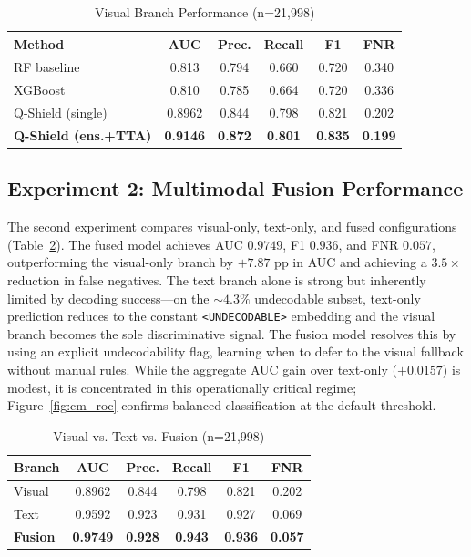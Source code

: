 \documentclass[conference]{IEEEtran}
\begin{document}
\begin{table}[!t]
\caption{Visual Branch Performance (n=21{,}998)}
\label{tab:visual}
\centering
\scriptsize
\begin{tabular}{lccccc}
\toprule
\textbf{Method} & \textbf{AUC} & \textbf{Prec.} & \textbf{Recall} & \textbf{F1} & \textbf{FNR} \\
\midrule
RF baseline & 0.813 & 0.794 & 0.660 & 0.720 & 0.340 \\
XGBoost & 0.810 & 0.785 & 0.664 & 0.720 & 0.336 \\
Q-Shield (single) & 0.8962 & 0.844 & 0.798 & 0.821 & 0.202 \\
\textbf{Q-Shield (ens.+TTA)} & \textbf{0.9146} & \textbf{0.872} & \textbf{0.801} & \textbf{0.835} & \textbf{0.199} \\
\bottomrule
\end{tabular}
\end{table}

\subsection{Experiment 2: Multimodal Fusion Performance}

The second experiment compares visual-only, text-only, and fused configurations (Table~\ref{tab:multimodal}). The fused model achieves AUC $0.9749$, F1 $0.936$, and FNR $0.057$, outperforming the visual-only branch by $+7.87$ pp in AUC and achieving a $3.5\times$ reduction in false negatives. The text branch alone is strong but inherently limited by decoding success---on the $\sim$$4.3\%$ undecodable subset, text-only prediction reduces to the constant \texttt{<UNDECODABLE>} embedding and the visual branch becomes the sole discriminative signal. The fusion model resolves this by using an explicit undecodability flag, learning when to defer to the visual fallback without manual rules. While the aggregate AUC gain over text-only ($+0.0157$) is modest, it is concentrated in this operationally critical regime; Figure~\ref{fig:cm_roc} confirms balanced classification at the default threshold.

\begin{table}[!t]
\caption{Visual vs. Text vs. Fusion (n=21{,}998)}
\label{tab:multimodal}
\centering
\scriptsize
\begin{tabular}{lccccc}
\toprule
\textbf{Branch} & \textbf{AUC} & \textbf{Prec.} & \textbf{Recall} & \textbf{F1} & \textbf{FNR} \\
\midrule
Visual & 0.8962 & 0.844 & 0.798 & 0.821 & 0.202 \\
Text & 0.9592 & 0.923 & 0.931 & 0.927 & 0.069 \\
\textbf{Fusion} & \textbf{0.9749} & \textbf{0.928} & \textbf{0.943} & \textbf{0.936} & \textbf{0.057} \\
\bottomrule
\end{tabular}
\end{table}
\end{document}
